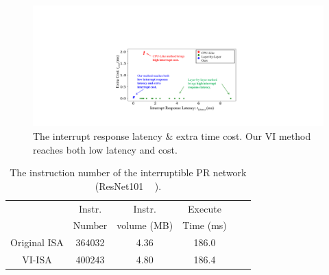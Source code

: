 \begin{figure}[t]
  \centering
  \includegraphics[width=0.99\linewidth]{fig/PRresult.pdf}
  \vspace{-9mm}
  \caption{The interrupt response latency \& extra time cost. Our VI method reaches both low latency and cost.}
  \label{fig:scatter1024}
\end{figure}
\begin{table}[t]
  \small
  \centering
  \caption{The instruction number of the interruptible PR network (ResNet101 ~\cite{he2016deep} ). }
\begin{tabular}{|c|c|c|c|c|c|}
  \hline
         & Instr.  & Instr. & Execute \\
        & Number   & volume (MB) & Time (ms) \\
  \hline
  Original ISA   &      364032      & 4.36 & 186.0 \\
  \hline
  VI-ISA   &     400243    & 4.80 & 186.4 \\
  \hline
  \end{tabular}%
  \label{tab:instrnum}%
\end{table}%



